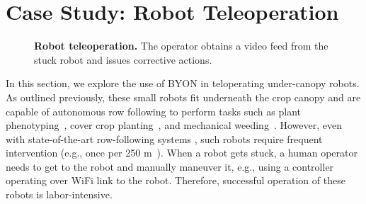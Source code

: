 \section{Case Study: Robot Teleoperation}
\label{sec:application}

\begin{figure*}[!ht] %
  \centering
  \hfill
  \vspace{-0.15in}
  \caption{\textbf{Robot teleoperation.} The operator obtains a video feed from the stuck robot and issues corrective actions. }
  \label{fig:teleoperation}
  \vspace{-0.2in}
\end{figure*}


In this section, we explore the use of BYON in teloperating under-canopy robots. As outlined previously, these small robots fit underneath the crop canopy and are capable of autonomous row following to perform tasks such as plant phenotyping~\cite{phenotyping1,sivakumar_learned_2021,manish_agbug_2021,kim_p-agbot_2022}, cover crop planting~\cite{icover_usda, farmprogress_robot, du_deep-cnn_2022}, and mechanical weeding~\cite{ mcallister_agbots_2020, naio_oz, reiser_development_2019}. However, even with state-of-the-art row-following systems \cite{sivakumar_learned_2021,velasquez_multi-sensor_2022,gasparino_cropnav_2023}, such robots require frequent intervention (e.g., once per 250 m~\cite{sivakumar_learned_2021}). When a robot gets stuck, a human operator needs to get to the robot and manually maneuver it, e.g., using a controller operating over WiFi link to the robot. Therefore, successful operation of these robots is labor-intensive. 


